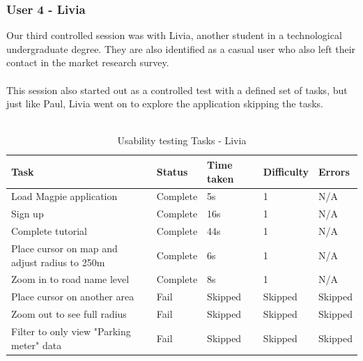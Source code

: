 \newpage
\subsubsection{User 4 - Livia}
Our third controlled session was with Livia, another student in a technological undergraduate degree. They are also identified as a casual user who also left their contact in the market research survey.\\\\
This session also started out as a controlled test with a defined set of tasks, but just like Paul, Livia went on to explore the application skipping the tasks.\\\\
\begin{table}[h!]
    \centering
    \caption{Usability testing Tasks - Livia}
    \begin{tabular}{|p{}|p{}|p{}|p{}|p{}|}
        \hline
        \textbf{Task}                                 & \textbf{Status} & \textbf{Time taken} & \textbf{Difficulty} & \textbf{Errors} \\
        \hline
        Load Magpie application                       & Complete        & 5s                  & 1                   & N/A             \\
        \hline
        Sign up                                       & Complete        & 16s                 & 1                   & N/A             \\
        \hline
        Complete tutorial                             & Complete        & 44s                 & 1                   & N/A             \\
        \hline
        Place cursor on map and adjust radius to 250m & Complete        & 6s                  & 1                   & N/A             \\
        \hline
        Zoom in to road name level                    & Complete        & 8s                  & 1                   & N/A             \\
        \hline
        Place cursor on another area                  & Fail            & Skipped             & Skipped             & Skipped         \\
        \hline
        Zoom out to see full radius                   & Fail            & Skipped             & Skipped             & Skipped         \\
        \hline
        Filter to only view "Parking meter" data      & Fail            & Skipped             & Skipped             & Skipped         \\

\end{tabular}
\end{table}
